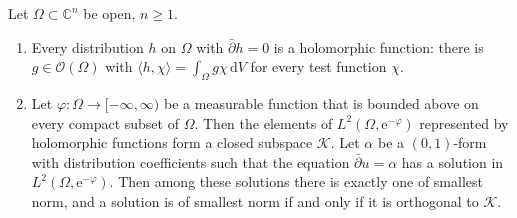 \begin{lemma}\label{lem:dbar-closed-distribution-holomorphic}
Let $\Omega\subset\mathbb C^n$ be open, $n\ge1$.
\begin{enumerate}
\item Every distribution $h$ on $\Omega$ with $\bar\partial h=0$ is a holomorphic function: there is $g\in\mathcal O(\Omega)$ with $\langle h,\chi\rangle=\int_\Omega g\chi\,\mathrm dV$ for every test function $\chi$.
\item Let $\varphi\colon\Omega\to[-\infty,\infty)$ be a measurable function that is bounded above on every compact subset of $\Omega$. Then the elements of $L^2(\Omega,\mathrm e^{-\varphi})$ represented by holomorphic functions form a closed subspace $\mathcal K$. Let $\alpha$ be a $(0,1)$-form with distribution coefficients such that the equation $\bar\partial u=\alpha$ has a solution in $L^2(\Omega,\mathrm e^{-\varphi})$. Then among these solutions there is exactly one of smallest norm, and a solution is of smallest norm if and only if it is orthogonal to $\mathcal K$.
\end{enumerate}
\end{lemma}
